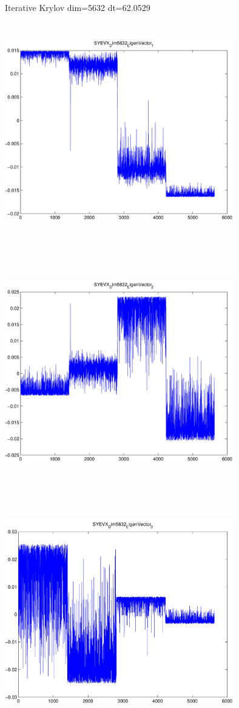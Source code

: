 \documentclass[9pt]{article}
\theoremstyle{plain}
\theoremstyle{definition}
\theoremstyle{remark}
\numberwithin{equation}{section}
\begin{document}
Iterative Krylov dim=5632 dt=62.0529
\includegraphics[width=10.0cm,height=10.0cm]{SYEVX_Dim5632_EigenVector_1.pdf}

\includegraphics[width=10.0cm,height=10.0cm]{SYEVX_Dim5632_EigenVector_2.pdf}

\includegraphics[width=10.0cm,height=10.0cm]{SYEVX_Dim5632_EigenVector_3.pdf}
\end{document}
